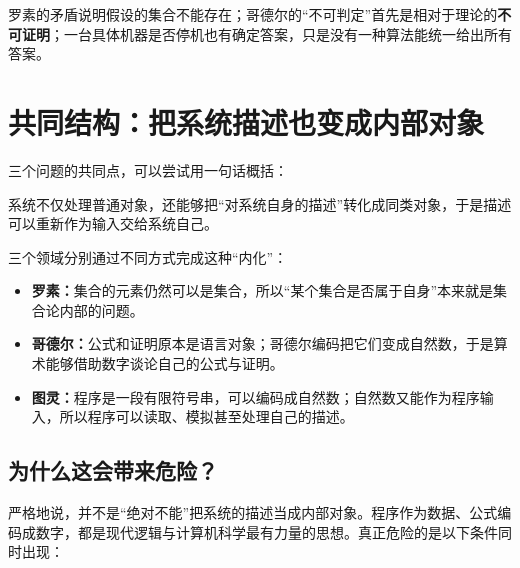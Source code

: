 \documentclass[11pt,a4paper]{article}
\begin{document}
\begin{warnbox}[先排除一个常见误解]
罗素的矛盾说明假设的集合不能存在；哥德尔的“不可判定”首先是相对于理论的\textbf{不可证明}；一台具体机器是否停机也有确定答案，只是没有一种算法能统一给出所有答案。
\end{warnbox}

\section{共同结构：把系统描述也变成内部对象}

三个问题的共同点，可以尝试用一句话概括：

\begin{keybox}[共同起点]
系统不仅处理普通对象，还能够把“对系统自身的描述”转化成同类对象，于是描述可以重新作为输入交给系统自己。
\end{keybox}

三个领域分别通过不同方式完成这种“内化”：

\begin{itemize}
  \item \textbf{罗素：}集合的元素仍然可以是集合，所以“某个集合是否属于自身”本来就是集合论内部的问题。
  \item \textbf{哥德尔：}公式和证明原本是语言对象；哥德尔编码把它们变成自然数，于是算术能够借助数字谈论自己的公式与证明。
  \item \textbf{图灵：}程序是一段有限符号串，可以编码成自然数；自然数又能作为程序输入，所以程序可以读取、模拟甚至处理自己的描述。
\end{itemize}

\subsection{为什么这会带来危险？}

严格地说，并不是“绝对不能”把系统的描述当成内部对象。程序作为数据、公式编码成数字，都是现代逻辑与计算机科学最有力量的思想。真正危险的是以下条件同时出现：

\begin{center}
\end{center}
\end{document}
